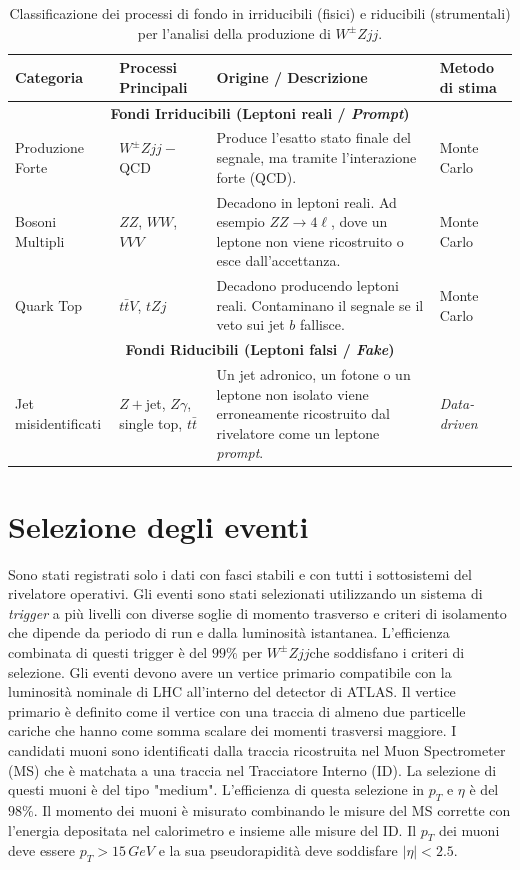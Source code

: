 \documentclass[11pt]{article}
\newcommand{\wzjjqcd}{$W^\pm Z jj-$ QCD}
\newcommand{\wzjj}{$W^\pm Z jj$}
\begin{document}
\begin{table}[htbp]
\centering
\renewcommand{\arraystretch}{1.4}
\begin{tabular}{p{3.2cm} p{3.2cm} p{5.2cm} p{2.5cm}}
\hline
\textbf{Categoria} & \textbf{Processi Principali} & \textbf{Origine / Descrizione} & \textbf{Metodo di stima} \\
\hline
\multicolumn{4}{c}{\textbf{Fondi Irriducibili (Leptoni reali / \textit{Prompt})}} \\
\hline
Produzione Forte & \wzjjqcd & Produce l'esatto stato finale del segnale, ma tramite l'interazione forte (QCD). & Monte Carlo \\
Bosoni Multipli & $ZZ$, $WW$, $VVV$ & Decadono in leptoni reali. Ad esempio $ZZ \to 4\ell$, dove un leptone non viene ricostruito o esce dall'accettanza. & Monte Carlo \\
Quark Top & $t\bar{t}V$, $tZj$ & Decadono producendo leptoni reali. Contaminano il segnale se il veto sui jet $b$ fallisce. & Monte Carlo \\
\hline
\multicolumn{4}{c}{\textbf{Fondi Riducibili (Leptoni falsi / \textit{Fake})}} \\
\hline
Jet misidentificati & $Z+$jet, $Z\gamma$, single top, $t\bar{t}$ & Un jet adronico, un fotone o un leptone non isolato viene erroneamente ricostruito dal rivelatore come un leptone \textit{prompt}. & \textit{Data-driven} \\
\hline
\end{tabular}
\caption{Classificazione dei processi di fondo in irriducibili (fisici) e riducibili (strumentali) per l'analisi della produzione di $W^\pm Zjj$.}
\label{tab:background_classification}
\end{table}
\section{Selezione degli eventi}
Sono stati registrati solo i dati con fasci stabili e con tutti i sottosistemi del rivelatore operativi. Gli eventi sono stati selezionati utilizzando un sistema di \textit{trigger} a più livelli con diverse soglie di momento trasverso e criteri di isolamento che dipende da periodo di run e dalla luminosità istantanea. L'efficienza combinata di questi trigger è del $99\%$ per \wzjj che soddisfano i criteri di selezione. Gli eventi devono avere un vertice primario compatibile con la luminosità nominale di LHC all'interno del detector di ATLAS. Il vertice primario è definito come il vertice con una traccia di almeno due particelle cariche che hanno come somma scalare dei momenti trasversi maggiore.
I candidati muoni sono identificati dalla traccia ricostruita nel Muon Spectrometer (MS) che è matchata a una traccia nel Tracciatore Interno (ID). La selezione di questi muoni è del tipo "medium". L'efficienza di questa selezione in $p_T$ e $\eta$ è del $98\%$. Il momento dei muoni è misurato combinando le misure del MS corrette con l'energia depositata nel calorimetro e insieme alle misure del ID. Il $p_T$ dei muoni deve essere $p_T>15\,\unit{GeV}$ e la sua pseudorapidità deve soddisfare $|\eta|<2.5$.
\end{document}
